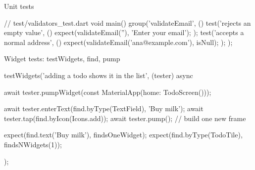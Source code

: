\documentclass[10pt,aspectratio=169,t]{beamer}
\begin{document}
\begin{frame}[fragile,eyebrow=Testing]{Unit tests}
\begin{dart}
// test/validators_test.dart
void main() {
  group('validateEmail', () {
    test('rejects an empty value', () {
      expect(validateEmail(''), 'Enter your email');
    });
    test('accepts a normal address', () {
      expect(validateEmail('ana@example.com'), isNull);
    });
  });
}
\end{dart}
  \vskip 2mm
\end{frame}

\begin{frame}[fragile,eyebrow=Testing]{Widget tests: testWidgets, find, pump}
\begin{dart}
testWidgets('adding a todo shows it in the list', (tester) async {
  await tester.pumpWidget(const MaterialApp(home: TodoScreen()));

  await tester.enterText(find.byType(TextField), 'Buy milk');
  await tester.tap(find.byIcon(Icons.add));
  await tester.pump();                       // build one new frame

  expect(find.text('Buy milk'), findsOneWidget);
  expect(find.byType(TodoTile), findsNWidgets(1));
});
\end{dart}
  \vskip 1mm
\end{frame}
\end{document}
